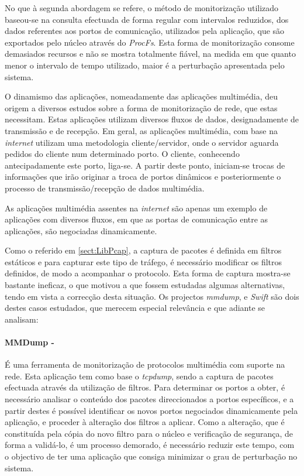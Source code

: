 No que à segunda abordagem se refere, o método de monitorização utilizado baseou-se na consulta efectuada de forma regular com intervalos reduzidos, dos dados referentes aos portos de comunicação, utilizados pela aplicação, que são exportados pelo núcleo através do \textit{ProcFs}.
Esta forma de monitorização consome demasiados recursos e não se mostra totalmente fiável, na medida em que quanto menor o intervalo de tempo utilizado, maior é a perturbação apresentada pelo sistema.

O dinamismo das aplicações, nomeadamente das aplicações multimédia, deu origem a diversos estudos sobre a forma de monitorização de rede, que estas necessitam.
Estas aplicações utilizam diversos fluxos de dados, designadamente de transmissão e de recepção.
Em geral, as aplicações multimédia, com base na \textit{internet} utilizam uma metodologia cliente/servidor, onde o servidor aguarda pedidos do cliente num determinado porto.
O cliente, conhecendo antecipadamente este porto, liga-se.
A partir deste ponto, iniciam-se trocas de informações que irão originar a troca de portos dinâmicos e posteriormente o processo de transmissão/recepção de dados multimédia.

As aplicações multimédia assentes na \textit{internet} são apenas um exemplo de aplicações com diversos fluxos, em que as portas de comunicação entre as aplicações, são negociadas dinamicamente.

Como o referido em \ref{sect:LibPcap}, a captura de pacotes é definida em filtros estáticos e para capturar este tipo de tráfego, é necessário modificar os filtros definidos, de modo a acompanhar o protocolo.
Esta forma de captura mostra-se bastante ineficaz, o que motivou a que fossem estudadas algumas alternativas, tendo em vista a correcção desta situação.
Os projectos \textit{mmdump}\cite{505678}, %
e \textit{Swift}\cite{1387609} são dois destes casos estudados, que merecem especial relevância e que adiante se analisam:

\paragraph*{MMDump - } É uma ferramenta de monitorização de protocolos multimédia com suporte na rede.
Esta aplicação tem como base o \textit{tcpdump}, sendo a captura de pacotes efectuada através da utilização de filtros.
Para determinar os portos a obter, é necessário analisar o conteúdo dos pacotes direccionados a portos específicos, e a partir destes é possível identificar os novos portos negociados dinamicamente pela aplicação, e proceder à alteração dos filtros a aplicar.
Como a alteração, que é constituída pela cópia do novo filtro para o núcleo e verificação de segurança, de forma a validá-lo, é um processo demorado, é necessário reduzir este tempo, com o objectivo de ter uma aplicação que consiga minimizar o grau de perturbação no sistema.

